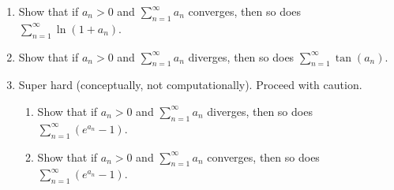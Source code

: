 \documentclass[11pt]{article}
\begin{document}
\begin{enumerate}
\begin{enumerate}
  \end{enumerate}

  \item Show that if $a_n > 0$ and $\displaystyle \sum_{n=1}^\infty a_n$
  converges, then so does $\displaystyle \sum_{n=1}^\infty \ln(1+a_n)$.

  \item Show that if $a_n > 0$ and $\displaystyle \sum_{n=1}^\infty a_n$
  diverges, then so does $\displaystyle \sum_{n=1}^\infty \tan(a_n)$.

  \item Super hard (conceptually, not computationally). Proceed with caution.
  \begin{enumerate}

    \item Show that if $a_n > 0$ and $\displaystyle \sum_{n=1}^\infty a_n$
    diverges, then so does $\displaystyle \sum_{n=1}^\infty \left( e^{a_n} - 1
    \right)$.

    \item Show that if $a_n > 0$ and $\displaystyle \sum_{n=1}^\infty a_n$
    converges, then so does $\displaystyle \sum_{n=1}^\infty \left( e^{a_n} - 1
    \right)$.

  \end{enumerate}

\end{enumerate}
\end{document}
